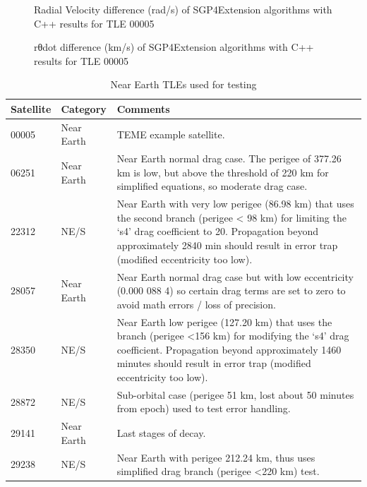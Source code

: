 \documentclass{article}
\begin{document}
\begin{figure}
    
    \caption{Radial Velocity difference (rad/s) of SGP4Extension algorithms with C++ results for TLE 00005}
    \label{fig:dvy}
\end{figure}

\begin{figure}
    
    \caption{rθdot difference (km/s) of SGP4Extension algorithms with C++ results for TLE 00005}
    \label{fig:dvz}
\end{figure}


\begin{table}[p]
\centering
\caption{Near Earth TLEs used for testing}\vspace{2mm}
\begin{tabular}{|l|l|p{14cm}|}
\hline\hline
Satellite & Category & Comments\\
\hline
00005 & Near Earth & TEME example satellite.\\
06251 &  Near Earth  & Near Earth normal drag case. The perigee of 377.26 km is low, but above the threshold of 220
km for simplified equations, so moderate drag case.\\
22312  & NE/S  & Near Earth with very low perigee (86.98 km) that uses the second branch (perigee < 98 km)
for limiting the ‘s4’ drag coefficient to 20. Propagation beyond approximately 2840 min
should result in error trap (modified eccentricity too low).\\
28057 &  Near Earth  & Near Earth normal drag case but with low eccentricity (0.000 088 4) so certain drag terms are
set to zero to avoid math errors / loss of precision.\\
28350 & NE/S  & Near Earth low perigee (127.20 km) that uses the branch (perigee \textless 156 km) for modifying
the ‘s4’ drag coefficient. Propagation beyond approximately 1460 minutes should result in
error trap (modified eccentricity too low).\\
28872  & NE/S  & Sub-orbital case (perigee 51 km, lost about 50 minutes from epoch) used to test error handling.\\
29141  & Near Earth  & Last stages of decay.\\
29238  & NE/S  & Near Earth with perigee 212.24 km, thus uses simplified drag branch (perigee \textless 220 km) test.\\
\hline\hline
\end{tabular}
\label{tab:res}
\end{table}
\end{document}
